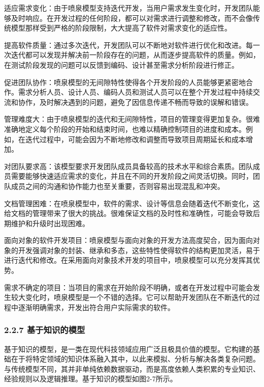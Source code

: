 
适应需求变化：由于喷泉模型支持迭代开发，当用户需求发生变化时，开发团队能够及时响应。在开发过程的任何阶段，都可以对需求进行调整和修改，而不会像传统模型那样受到严格的阶段限制，大大提高了软件对需求变化的适应性。

提高软件质量：通过多次迭代，开发团队可以不断地对软件进行优化和改进。每一次迭代都可以发现并解决前一阶段存在的问题，从而逐步提高软件的质量。例如，在测试阶段发现的问题可以反馈到编码、设计甚至需求分析阶段进行修正。

促进团队协作：喷泉模型的无间隙特性使得各个开发阶段的人员能够更紧密地合作。需求分析人员、设计人员、编码人员和测试人员可以在整个开发过程中持续交流和协作，及时解决遇到的问题，避免了因信息传递不畅而导致的误解和错误。


管理难度大：由于喷泉模型的迭代和无间隙特性，项目的管理变得更加复杂。很难准确地定义每个阶段的开始和结束时间，也难以精确控制项目的进度和成本。例如，在迭代过程中，可能会因为不断地修改和调整而导致项目周期延长和成本增加。

对团队要求高：该模型要求开发团队成员具备较高的技术水平和综合素质。团队成员需要能够快速适应需求的变化，并且在不同的开发阶段之间灵活切换。同时，团队成员之间的沟通和协作能力也至关重要，否则容易出现混乱和冲突。

文档管理困难：在喷泉模型中，软件的需求、设计等信息会随着迭代不断变化，这给文档的管理带来了很大的挑战。很难保证文档的及时性和准确性，可能会导致后期维护和升级时出现困难。


面向对象的软件开发项目：喷泉模型与面向对象的开发方法高度契合，因为面向对象的开发强调对象的封装、继承和多态，这些特性使得软件的结构更加灵活，易于进行迭代和修改。在采用面向对象技术开发的项目中，喷泉模型可以充分发挥其优势。

需求不确定的项目：当项目的需求在开始阶段不明确，或者在开发过程中可能会发生较大变化时，喷泉模型是一个不错的选择。它可以帮助开发团队在不断迭代的过程中逐渐明确需求，开发出符合用户实际需求的软件。

\hypertarget{ux57faux4e8eux77e5ux8bc6ux7684ux6a21ux578b}{%
\subsubsection{2.2.7 基于知识的模型}\label{ux57faux4e8eux77e5ux8bc6ux7684ux6a21ux578b}}

基于知识的模型，是一类在现代科技领域应用广泛且极具价值的模型。它构建的基础在于将特定领域的知识体系融入其中，以此来模拟、分析与解决各类复杂问题。与传统模型不同，其并非单纯依赖数据驱动，而是高度依赖人类积累的专业知识、经验规则以及逻辑推理。基于知识的模型如图2-7所示。

